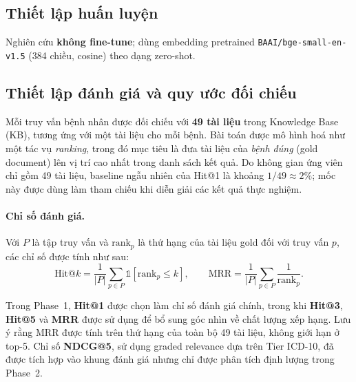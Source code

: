 \subsection{Thiết lập huấn luyện}
Nghiên cứu \textbf{không fine-tune}; dùng embedding pretrained \texttt{BAAI/bge-small-en-v1.5} (384 chiều, cosine) theo dạng zero-shot.

\subsection{Thiết lập đánh giá và quy ước đối chiếu}

Mỗi truy vấn bệnh nhân được đối chiếu với \textbf{49 tài liệu} trong Knowledge Base (KB), tương ứng với một tài liệu cho mỗi bệnh. Bài toán được mô hình hoá như một tác vụ \emph{ranking}, trong đó mục tiêu là đưa tài liệu của \textit{bệnh đúng} (gold document) lên vị trí cao nhất trong danh sách kết quả. Do không gian ứng viên chỉ gồm 49 tài liệu, baseline ngẫu nhiên của Hit@1 là khoảng $1/49 \approx 2\%$; mốc này được dùng làm tham chiếu khi diễn giải các kết quả thực nghiệm.

\paragraph{Chỉ số đánh giá.}
Với $P$ là tập truy vấn và $\mathrm{rank}_p$ là thứ hạng của tài liệu gold đối với truy vấn $p$, các chỉ số được tính như sau:
\begin{equation}
    \mathrm{Hit@}k=\frac{1}{|P|}\sum_{p\in P}\mathbb{1}\!\left[\mathrm{rank}_p\le k\right],
    \qquad
    \mathrm{MRR}=\frac{1}{|P|}\sum_{p\in P}\frac{1}{\mathrm{rank}_p}.
\end{equation}

Trong Phase~1, \textbf{Hit@1} được chọn làm chỉ số đánh giá chính, trong khi \textbf{Hit@3}, \textbf{Hit@5} và \textbf{MRR} được sử dụng để bổ sung góc nhìn về chất lượng xếp hạng. Lưu ý rằng MRR được tính trên thứ hạng của toàn bộ 49 tài liệu, không giới hạn ở top-5. Chỉ số \textbf{NDCG@5}, sử dụng graded relevance dựa trên Tier ICD-10, đã được tích hợp vào khung đánh giá nhưng chỉ được phân tích định lượng trong Phase~2.

